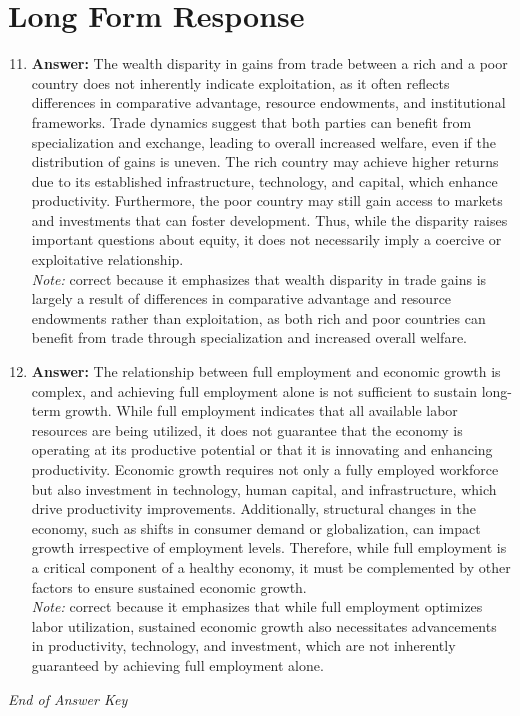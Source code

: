 \documentclass[12pt]{article}
\begin{document}
\section*{Long Form Response}
\begin{enumerate}[label=\arabic*.]
\setcounter{enumi}{10}
\item \textbf{Answer:} The wealth disparity in gains from trade between a rich and a poor country does not inherently indicate exploitation, as it often reflects differences in comparative advantage, resource endowments, and institutional frameworks. Trade dynamics suggest that both parties can benefit from specialization and exchange, leading to overall increased welfare, even if the distribution of gains is uneven. The rich country may achieve higher returns due to its established infrastructure, technology, and capital, which enhance productivity. Furthermore, the poor country may still gain access to markets and investments that can foster development. Thus, while the disparity raises important questions about equity, it does not necessarily imply a coercive or exploitative relationship.
\\ \textit{Note:} correct because it emphasizes that wealth disparity in trade gains is largely a result of differences in comparative advantage and resource endowments rather than exploitation, as both rich and poor countries can benefit from trade through specialization and increased overall welfare.
\item \textbf{Answer:} The relationship between full employment and economic growth is complex, and achieving full employment alone is not sufficient to sustain long-term growth. While full employment indicates that all available labor resources are being utilized, it does not guarantee that the economy is operating at its productive potential or that it is innovating and enhancing productivity. Economic growth requires not only a fully employed workforce but also investment in technology, human capital, and infrastructure, which drive productivity improvements. Additionally, structural changes in the economy, such as shifts in consumer demand or globalization, can impact growth irrespective of employment levels. Therefore, while full employment is a critical component of a healthy economy, it must be complemented by other factors to ensure sustained economic growth.
\\ \textit{Note:} correct because it emphasizes that while full employment optimizes labor utilization, sustained economic growth also necessitates advancements in productivity, technology, and investment, which are not inherently guaranteed by achieving full employment alone.
\end{enumerate}

\vfill
\noindent\textit{End of Answer Key}
\end{document}
